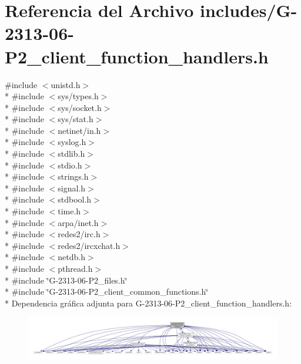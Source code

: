 \hypertarget{G-2313-06-P2__client__function__handlers_8h}{}\section{Referencia del Archivo includes/\+G-\/2313-\/06-\/\+P2\+\_\+client\+\_\+function\+\_\+handlers.h}
\label{G-2313-06-P2__client__function__handlers_8h}
{\ttfamily \#include $<$unistd.\+h$>$}\\*
{\ttfamily \#include $<$sys/types.\+h$>$}\\*
{\ttfamily \#include $<$sys/socket.\+h$>$}\\*
{\ttfamily \#include $<$sys/stat.\+h$>$}\\*
{\ttfamily \#include $<$netinet/in.\+h$>$}\\*
{\ttfamily \#include $<$syslog.\+h$>$}\\*
{\ttfamily \#include $<$stdlib.\+h$>$}\\*
{\ttfamily \#include $<$stdio.\+h$>$}\\*
{\ttfamily \#include $<$strings.\+h$>$}\\*
{\ttfamily \#include $<$signal.\+h$>$}\\*
{\ttfamily \#include $<$stdbool.\+h$>$}\\*
{\ttfamily \#include $<$time.\+h$>$}\\*
{\ttfamily \#include $<$arpa/inet.\+h$>$}\\*
{\ttfamily \#include $<$redes2/irc.\+h$>$}\\*
{\ttfamily \#include $<$redes2/ircxchat.\+h$>$}\\*
{\ttfamily \#include $<$netdb.\+h$>$}\\*
{\ttfamily \#include $<$pthread.\+h$>$}\\*
{\ttfamily \#include \char`\"{}G-\/2313-\/06-\/\+P2\+\_\+files.\+h\char`\"{}}\\*
{\ttfamily \#include \char`\"{}G-\/2313-\/06-\/\+P2\+\_\+client\+\_\+common\+\_\+functions.\+h\char`\"{}}\\*
Dependencia gráfica adjunta para G-\/2313-\/06-\/\+P2\+\_\+client\+\_\+function\+\_\+handlers.h\+:\nopagebreak
\begin{figure}[H]
\begin{center}
\leavevmode
\includegraphics[width=350pt]{G-2313-06-P2__client__function__handlers_8h__incl}
\end{center}
\end{figure}
